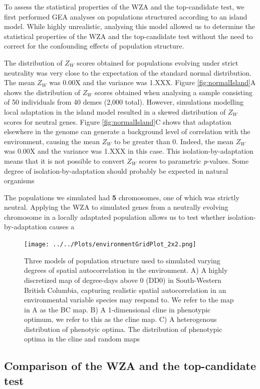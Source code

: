 \documentclass[11pt,twoside,lineno]{GSA_format}
\begin{document}
To assess the statistical properties of the WZA and the top-candidate test, we first performed GEA analyses on populations structured according to an island model. While highly unrealistic, analysing this model allowed us to determine the statistical properties of the WZA and the top-candidate test without the need to correct for the confounding effects of population structure. 

The distribution of $Z_W$ scores obtained for populations evolving under strict neutrality was very close to the expectation of the standard normal distribution. The mean $Z_W$ was 0.00X and the variance was 1.XXX. Figure \ref{fig:normalIsland}A shows the distribution of $Z_W$ scores obtained when analysing a sample consisting of 50 individuals from 40 demes (2,000 total).  However, simulations modelling local adaptation in the island model resulted in a skewed distribution of $Z_W$ scores for neutral genes. Figure \ref{fig:normalIsland}C shows that adaptation elsewhere in the genome can generate a background level of correlation with the environment, causing the mean $Z_W$ to be greater than 0. Indeed, the mean $Z_W$ was 0.00X and the variance was 1.XXX in this case. This isolation-by-adaptation means that it is not possible to convert $Z_W$ scores to parametric \textit{p}-values. 
Some degree of isolation-by-adaptation should probably be expected in natural organisms

The populations we simulated had \textbf{5} chromosomes, one of which was strictly neutral. Applying the WZA to simulated genes from a neutrally evolving chromosome in a locally adaptated population allows us to test whether isolation-by-adaptation causes a 

\begin{figure}
  \texttt{[image: ../../Plots/environmentGridPlot\_2x2.png]}
  \caption{Three models of population structure used to simulated varying degrees of spatial autocorrelation in the environment. A) A highly discretized map of degree-days above 0 (DD0) in South-Western British Columbia, capturing realistic spatial autocorrelation in an environmental variable species may respond to. We refer to the map in A as the BC map. B) A 1-dimensional cline in phenotypic optimum, we refer to this as the cline map. C) A heterogenous distribution of phenotyic optima. The distribution of phenotypic optima in the cline and random maps}
  
  \label{fig:boat1}
\end{figure}

\subsection{Comparison of the WZA and the top-candidate test}
\end{document}
